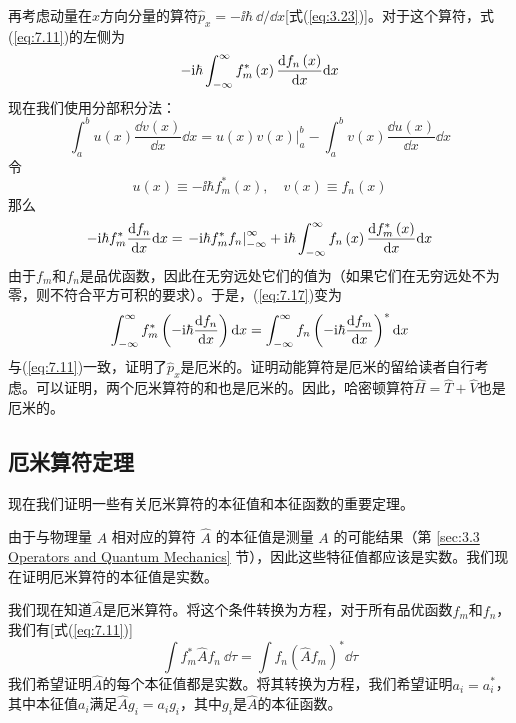     再考虑动量在$x$方向分量的算符$\hat{p}_x = -\ii \hbar \: \dd /\dd x$[式(\ref{eq:3.23})]。对于这个算符，式(\ref{eq:7.11})的左侧为
    \begin{equation*}
        -\mathrm{i} \hbar \int_{-\infty}^{\infty}  f_m^{\ast}\left(x\right)\frac{\dd f_n\left(x\right)}{\dd x} \dd x
    \end{equation*}
    现在我们使用分部积分法：
    \begin{equation}
        \int_{a}^{b}u\left(x\right)\frac{\dd v\left(x\right)}{\dd x}\dd x = \left. u\left(x\right)v\left(x\right)\right|_{a}^{b} - \int_{a}^{b}v\left(x\right)\frac{\dd u\left(x\right)}{\dd x}\dd x
        \label{eq:7.16}
    \end{equation}
    令
    \begin{equation*}
        u\left(x\right) \equiv -\ii \hbar f_m^{\ast}\left(x\right), \quad v\left(x\right) \equiv f_n\left(x\right)
    \end{equation*}
    那么
    \begin{equation}
        -\mathrm{i} \hbar f_m^{\ast}\frac{\dd f_n}{\dd x}\dd x = \left. -\mathrm{i} \hbar f_m^{\ast}f_n\right|_{-\infty}^{\infty} + \mathrm{i} \hbar \int_{-\infty}^{\infty}  f_n\left(x\right)\frac{\dd f_m^{\ast}\left(x\right)}{\dd x}\dd x
        \label{eq:7.17}
    \end{equation}
    由于$f_m$和$f_n$是品优函数，因此在无穷远处它们的值为（如果它们在无穷远处不为零，则不符合平方可积的要求）。于是，(\ref{eq:7.17})变为
    \begin{equation*}
        \int_{-\infty}^{\infty}  f_m^{\ast}\left(-\mathrm{i} \hbar \frac{\dd f_n}{\dd x}\right)\dd x = \int_{-\infty}^{\infty}  f_n\left(-\mathrm{i} \hbar \frac{\dd f_m}{\dd x}\right)^{\ast}\dd x
    \end{equation*}
    与(\ref{eq:7.11})一致，证明了$\hat{p}_x$是厄米的。证明动能算符是厄米的留给读者自行考虑。可以证明，两个厄米算符的和也是厄米的。因此，哈密顿算符$\hat{H} = \hat{T} + \hat{V}$也是厄米的。

\subsection*{厄米算符定理}

    现在我们证明一些有关厄米算符的本征值和本征函数的重要定理。

    由于与物理量 $A$ 相对应的算符 $\hat{A}$ 的本征值是测量 $A$ 的可能结果（第 \ref{sec:3.3 Operators and Quantum Mechanics} 节），因此这些特征值都应该是实数。我们现在证明厄米算符的本征值是实数。

    我们现在知道$\hat{A}$是厄米算符。将这个条件转换为方程，对于所有品优函数$f_m$和$f_n$，我们有[式(\ref{eq:7.11})]
    \begin{equation}
        \int f^{\ast}_m \hat{A} f_n \:\dd \tau = \int f_n \left(\hat{A} f_m\right)^{\ast} \dd \tau
        \label{eq:7.18}
    \end{equation}
    我们希望证明$\hat{A}$的每个本征值都是实数。将其转换为方程，我们希望证明$a_i = a_i^{\ast}$，其中本征值$a_i$满足$\hat{A}g_i = a_i g_i$，其中$g_i$是$\hat{A}$的本征函数。


